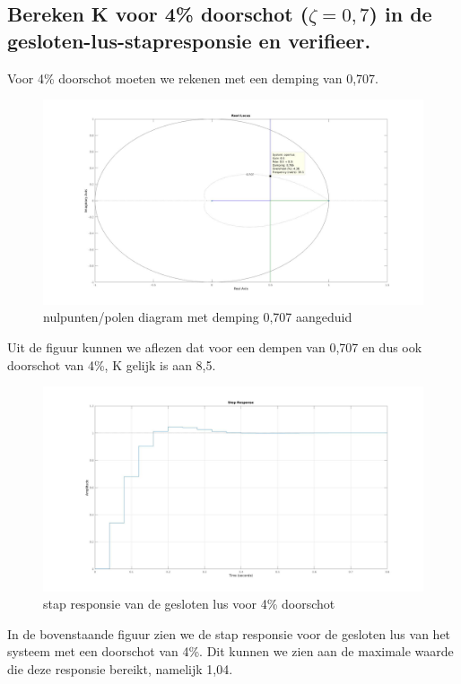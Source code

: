 \documentclass[a4paper, 12pt]{article}
\begin{document}
\subsection{Bereken K voor 4\% doorschot ($\zeta = 0,7$) in de gesloten-lus-stapresponsie en verifieer.}

Voor 4\% doorschot moeten we rekenen met een demping van 0,707.

\begin{figure}[!h]
	\includegraphics[width=0.9\linewidth]{Labo3_4_rootlocus2.jpg}
	\caption{nulpunten/polen diagram met demping 0,707 aangeduid}
\end{figure}

Uit de figuur kunnen we aflezen dat voor een dempen van 0,707 en dus ook doorschot van 4\%, K gelijk is aan 8,5.

\begin{figure}[!h]
	\includegraphics[width=1\linewidth]{Labo3_4_step_response2.jpg}
	\caption{stap responsie van de gesloten lus voor 4\% doorschot}
\end{figure}

In de bovenstaande figuur zien we de stap responsie voor de gesloten lus van het systeem met een doorschot van 4\%. Dit kunnen we zien aan de maximale waarde die deze responsie bereikt, namelijk 1,04.
\end{document}
